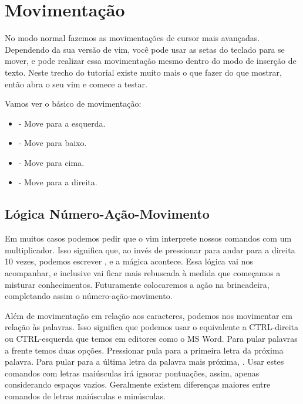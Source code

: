 
\section{Movimentação}
No modo normal fazemos as movimentações de cursor mais avançadas.
Dependendo da sua versão de vim, você pode usar as setas do teclado para se mover,
e pode realizar essa movimentação mesmo dentro do modo de inserção de texto.
Neste trecho do tutorial existe muito mais o que fazer do que mostrar,
então abra o seu vim e comece a testar.

Vamos ver o básico de movimentação:
\begin{multicols}{2}
\begin{itemize}
    \item {} - Move para a esquerda.
    \item {} - Move para baixo.
    \item {} - Move para cima.
    \item {} - Move para a direita.
\end{itemize}
\end{multicols}



\subsection{Lógica Número-Ação-Movimento}
Em muitos casos podemos pedir que o vim interprete nossos comandos com um multiplicador.
Isso significa que, ao invés de pressionar  para andar para a direita 10 vezes,
podemos escrever , e a mágica acontece.
Essa lógica vai nos acompanhar, e inclusive vai ficar mais rebuscada à medida que começamos a misturar conhecimentos.
Futuramente colocaremos a ação na brincadeira, completando assim o número-ação-movimento.


Além de movimentação em relação aos caracteres, podemos nos movimentar em relação às palavras.
Isso significa que podemos usar o equivalente a CTRL-direita ou CTRL-esquerda que temos em editores como o MS Word.
Para pular palavras a frente temos duas opções.
Pressionar  pula para a primeira letra da próxima palavra.
Para pular para a última letra da palavra mais próxima, .
Usar estes comandos com letras maiúsculas irá ignorar pontuações, assim, apenas considerando espaços vazios.
Geralmente existem diferenças maiores entre comandos de letras maiúsculas e minúsculas.

